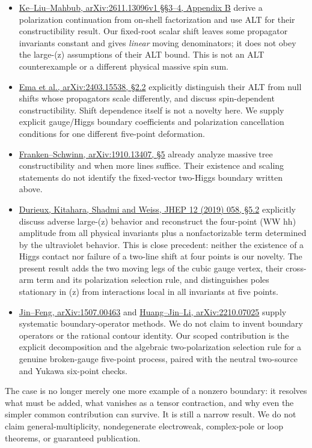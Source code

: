 \documentclass[
]{article}
\providecommand{\tightlist}{%
  \setlength{\itemsep}{0pt}\setlength{\parskip}{0pt}}
\begin{document}
\begin{itemize}
\tightlist
\item
  \href{https://arxiv.org/html/2611.13096v1\#S3}{Ke--Liu--Mahbub,
  arXiv:2611.13096v1 §§3--4, Appendix B} derive a polarization
  continuation from on-shell factorization and use ALT for their
  constructibility result. Our fixed-root scalar shift leaves some
  propagator invariants constant and gives \emph{linear} moving
  denominators; it does not obey the large-(z) assumptions of their ALT
  bound. This is not an ALT counterexample or a different physical
  massive spin sum.
\item
  \href{https://arxiv.org/html/2403.15538\#S2.SS2}{Ema et al.,
  arXiv:2403.15538, §2.2} explicitly distinguish their ALT from null
  shifts whose propagators scale differently, and discuss spin-dependent
  constructibility. Shift dependence itself is not a novelty here. We
  supply explicit gauge/Higgs boundary coefficients and polarization
  cancellation conditions for one different five-point deformation.
\item
  \href{https://arxiv.org/abs/1910.13407}{Franken--Schwinn,
  arXiv:1910.13407, §5} already analyze massive tree constructibility
  and when more lines suffice. Their existence and scaling statements do
  not identify the fixed-vector two-Higgs boundary written above.
\item
  \href{https://doi.org/10.1007/JHEP12\%282019\%29058}{Durieux,
  Kitahara, Shadmi and Weiss, JHEP 12 (2019) 058, §5.2} explicitly
  discuss adverse large-(z) behavior and reconstruct the four-point
  (W\overline W hh) amplitude from all physical invariants plus a
  nonfactorizable term determined by the ultraviolet behavior. This is
  close precedent: neither the existence of a Higgs contact nor failure
  of a two-line shift at four points is our novelty. The present result
  adds the two moving legs of the cubic gauge vertex, their cross-arm
  term and its polarization selection rule, and distinguishes poles
  stationary in (z) from interactions local in all invariants at five
  points.
\item
  \href{https://arxiv.org/abs/1507.00463}{Jin--Feng, arXiv:1507.00463}
  and \href{https://arxiv.org/abs/2210.07025}{Huang--Jin--Li,
  arXiv:2210.07025} supply systematic boundary-operator methods. We do
  not claim to invent boundary operators or the rational contour
  identity. Our scoped contribution is the explicit decomposition and
  the algebraic two-polarization selection rule for a genuine
  broken-gauge five-point process, paired with the neutral two-source
  and Yukawa six-point checks.
\end{itemize}

The case is no longer merely one more example of a nonzero boundary: it
resolves what must be added, what vanishes as a tensor contraction, and
why even the simpler common contribution can survive. It is still a
narrow result. We do not claim general-multiplicity, nondegenerate
electroweak, complex-pole or loop theorems, or guaranteed publication.
\end{document}
